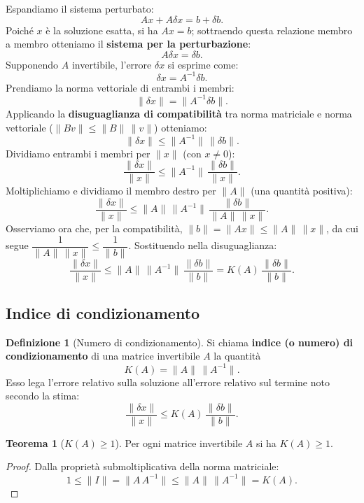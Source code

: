 \documentclass[a4paper,12pt]{article}
\theoremstyle{definition}
\newtheorem{definizione}{Definizione}[section]
\newtheorem{teorema}{Teorema}[section]
\theoremstyle{remark}
\begin{document}
Espandiamo il sistema perturbato:
\[
  Ax + A\delta x = b + \delta b.
\]
Poiché $x$ è la soluzione esatta, si ha $Ax = b$; sottraendo questa
relazione membro a membro otteniamo il \textbf{sistema per la perturbazione}:
\[
  A\delta x = \delta b.
\]
Supponendo $A$ invertibile, l'errore $\delta x$ si esprime come:
\[
  \delta x = A^{-1}\delta b.
\]
Prendiamo la norma vettoriale di entrambi i membri:
\[
  \|\delta x\| = \|A^{-1}\delta b\|.
\]
Applicando la \textbf{disuguaglianza di compatibilità} tra norma matriciale
e norma vettoriale ($\|Bv\| \leq \|B\|\,\|v\|$) otteniamo:
\[
  \|\delta x\| \leq \|A^{-1}\|\,\|\delta b\|.
\]
Dividiamo entrambi i membri per $\|x\|$ (con $x \neq 0$):
\[
  \frac{\|\delta x\|}{\|x\|} \leq \|A^{-1}\|\,\frac{\|\delta b\|}{\|x\|}.
\]
Moltiplichiamo e dividiamo il membro destro per $\|A\|$ (una quantità positiva):
\[
  \frac{\|\delta x\|}{\|x\|}
  \leq \|A\|\,\|A^{-1}\|\,\frac{\|\delta b\|}{\|A\|\,\|x\|}.
\]
Osserviamo ora che, per la compatibilità, $\|b\| = \|Ax\| \leq \|A\|\,\|x\|$,
da cui segue $\dfrac{1}{\|A\|\,\|x\|} \leq \dfrac{1}{\|b\|}$.
Sostituendo nella disuguaglianza:
\[
  \frac{\|\delta x\|}{\|x\|}
  \leq \|A\|\,\|A^{-1}\|\,\frac{\|\delta b\|}{\|b\|}
  = K(A)\,\frac{\|\delta b\|}{\|b\|}.
\]

\subsection{Indice di condizionamento}

\begin{definizione}[Numero di condizionamento]
Si chiama \textbf{indice (o numero) di condizionamento} di una matrice
invertibile $A$ la quantità
\[
  \boxed{K(A) = \|A\|\,\|A^{-1}\|.}
\]
Esso lega l'errore relativo sulla soluzione all'errore relativo sul
termine noto secondo la stima:
\[
  \frac{\|\delta x\|}{\|x\|}
  \leq K(A)\,\frac{\|\delta b\|}{\|b\|}.
\]
\end{definizione}

\begin{teorema}[$K(A) \geq 1$]
Per ogni matrice invertibile $A$ si ha $K(A) \geq 1$.
\end{teorema}
\begin{proof}
Dalla proprietà submoltiplicativa della norma matriciale:
\[
  1 \leq \|I\| = \|A\,A^{-1}\| \leq \|A\|\,\|A^{-1}\| = K(A).
\]
\end{proof}
\end{document}
